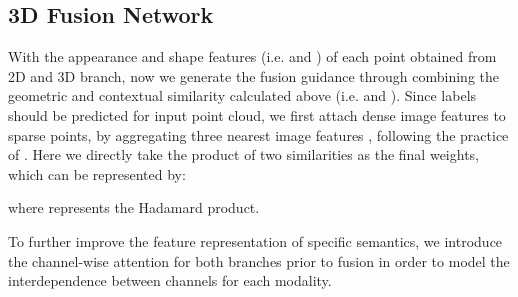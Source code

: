 \documentclass[letterpaper, 10 pt, conference]{ieeeconf}
\begin{document}
\begin{table}[t]
\caption{Comparison with multi-view and point-based methods on ScanNetV2 Benchmark}
\begin{center}
\vspace{-8mm}
\end{center}

\end{table}

\subsection{3D Fusion Network}




With the appearance and shape features (i.e.  and  ) of each point obtained from 2D and 3D branch, now we generate the fusion guidance through combining the geometric and contextual similarity calculated above (i.e.  and ).  Since labels should be predicted for input point cloud, we first attach dense image features to sparse points, by aggregating three nearest image  features , following the practice of \cite{jaritz2019multi}. 
Here we directly take the product of two similarities as the final weights, which can be represented by:

where  represents the Hadamard product. 

To further improve the feature representation of specific semantics, we introduce the channel-wise attention \cite{fu2019dual} for both branches prior to fusion in order to model the interdependence between channels for each modality. 
\end{document}
